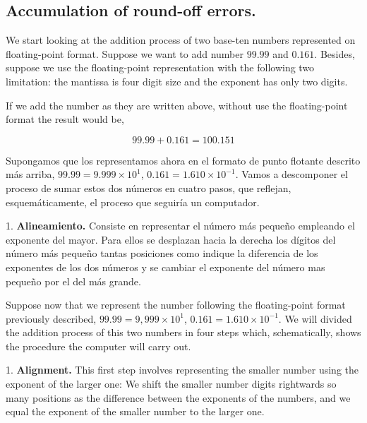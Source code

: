 \begin{paracol}{2}
\subsection{Accumulation of round-off errors.} 
We start looking at the addition process of two base-ten numbers represented on floating-point format. Suppose we want to add number $99.99$ and $0.161$. Besides, suppose we use the floating-point representation with the following two limitation: the mantissa is four digit size and the exponent has only two digits.

If we add the number as they are written above, without use the floating-point format the result would be,  
\end{paracol}
\begin{equation*}
99.99+0.161=100.151
\end{equation*}

\begin{paracol}{2}
Supongamos que los representamos ahora en el formato de punto flotante descrito más arriba, $99.99=9.999\times10^1$, $0.161=1.610\times10^{-1}$. Vamos a descomponer el proceso de sumar estos dos números en cuatro pasos, que reflejan, esquemáticamente, el proceso que seguiría un computador.

1. \textbf{Alineamiento.} Consiste en representar el número más pequeño empleando el exponente del mayor. Para ellos se desplazan hacia la derecha los dígitos del número más pequeño tantas posiciones como indique la diferencia de los exponentes de los dos números y se cambiar el exponente del número mas pequeño por el del más grande.

\switchcolumn
Suppose now that we represent the number following the floating-point format previously described, $99.99 = 9,999\times 10^1$, $0.161 = 1.610\times 10^{-1}$. We will divided the addition process of this two numbers in four steps which, schematically, shows the procedure the computer will carry out.

1. \textbf{Alignment.} This first step involves representing the smaller number using the exponent of the larger one: We shift the smaller number digits rightwards so many positions as the difference between the exponents of the numbers, and we equal the exponent of the smaller number to the larger one.  
\end{paracol}

